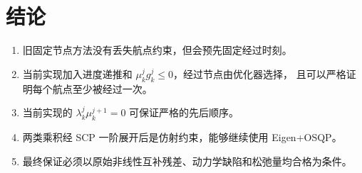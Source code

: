\documentclass[UTF8,a4paper,11pt]{ctexart}
\begin{document}
\section{结论}

\begin{enumerate}
 \item 旧固定节点方法没有丢失航点约束，但会预先固定经过时刻。
 \item 当前实现加入进度递推和 $\mu_k^j g_k^j\leq0$，经过节点由优化器选择，
 且可以严格证明每个航点至少被经过一次。
 \item 当前实现的 $\lambda_k^j\mu_k^{j+1}=0$ 可保证严格的先后顺序。
 \item 两类乘积经 SCP 一阶展开后是仿射约束，能够继续使用 Eigen+OSQP。
 \item 最终保证必须以原始非线性互补残差、动力学缺陷和松弛量均合格为条件。
\end{enumerate}
\end{document}
